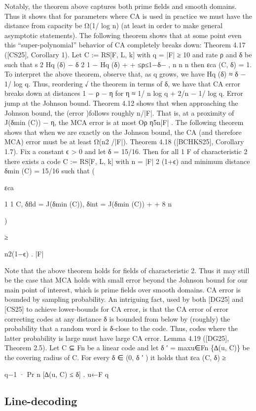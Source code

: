 \documentclass[11pt]{article}
\begin{document}
Notably, the theorem above captures both prime fields and smooth domains. Thus it shows that
for parameters where CA is used in practice we must have the distance from capacity be Ω(1/ log n)
(at least in order to make general asymptotic statements).
The following theorem shows that at some point even this “super-polynomial” behavior of CA
completely breaks down:
Theorem 4.17 ([CS25], Corollary 1). Let C := RS[F, L, k] with q = |F| ≥ 10 and rate ρ and δ be
such that
s
2
Hq (δ) − δ
2
1 − Hq (δ) + +
≤ρ≤1−δ− ,
n
n
n
then εca (C, δ) = 1.
To interpret the above theorem, observe that, as q grows, we have Hq (δ) ≈ δ − 1/ log q. Thus,
reordering
√ the theorem in terms of δ, we have that CA error breaks down at distances 1 − ρ − η for
η ≈ 1/ n log q + 2/n − 1/ log q.
Error jump at the Johnson bound. Theorem 4.12 shows that when approaching the Johnson
bound, the (error )follows roughly n/|F|. That is, at a proximity of J(δmin (C)) − η, the MCA error is
at most Oρ η5n|F| . The following theorem shows that when we are exactly on the Johnson bound,
the CA (and therefore MCA) error must be at least Ω(n2 /|F|).
Theorem 4.18 ([BCHKS25], Corollary 1.7). Fix a constant ϵ > 0 and let δ = 15/16. Then for all
1
F of characteristic 2 there exists a code C := RS[F, L, k] with n = |F| 2 (1+ϵ) and minimum distance
δmin (C) = 15/16 such that
(

εca

1 1
C, δfld = J(δmin (C)), δint = J(δmin (C)) + +
8 n

)

≥

n2(1−ϵ)
.
|F|

Note that the above theorem holds for fields of characteristic 2. Thus it may still be the case that
MCA holds with small error beyond the Johnson bound for our main point of interest, which is
prime fields over smooth domains.
CA error is bounded by sampling probability. An intriguing fact, used by both [DG25] and
[CS25] to achieve lower-bounds for CA error, is that the CA error of error correcting codes at any
distance δ is bounded from below by (roughly) the probability that a random word is δ-close to the
code. Thus, codes where the latter probability is large must have large CA error.
Lemma 4.19 ([DG25], Theorem 2.5). Let C ⊆ Fn be a linear code and let δ ′ = maxu∈Fn \{∆(u, C)\}
be the covering radius of C. For every δ ∈ (0, δ ′ ) it holds that
εca (C, δ) ≥

q−1
· Pr n [∆(u, C) ≤ δ] .
u←F
q


\subsection{Line-decoding}
\end{document}
